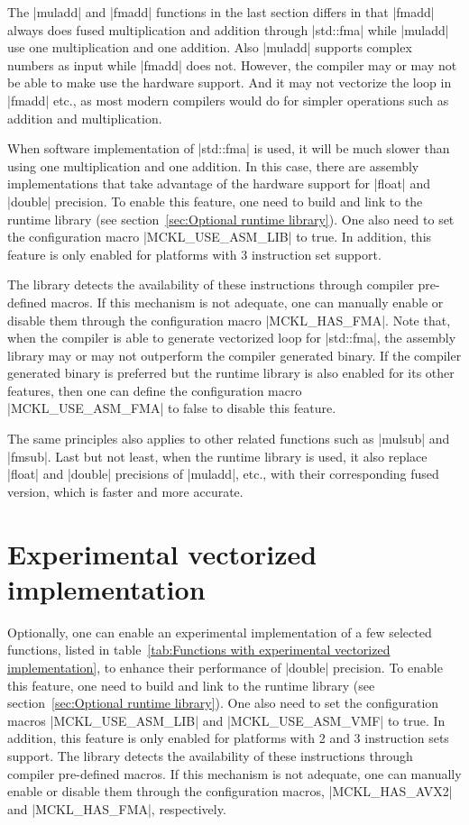 The |muladd| and |fmadd| functions in the last section differs in that |fmadd|
always does fused multiplication and addition through |std::fma| while |muladd|
use one multiplication and one addition. Also |muladd| supports complex numbers
as input while |fmadd| does not. However, the compiler may or may not be able
to make use the hardware \fma support. And it may not vectorize the loop in
|fmadd| etc., as most modern \cpp compilers would do for simpler operations
such as addition and multiplication.

When software implementation of |std::fma| is used, it will be much slower than
using one multiplication and one addition. In this case, there are assembly
implementations that take advantage of the hardware support for |float| and
|double| precision. To enable this feature, one need to build and link to the
runtime library (see section~\ref{sec:Optional runtime library}). One also need
to set the configuration macro |MCKL_USE_ASM_LIB| to true. In addition, this
feature is only enabled for platforms with \fma{}3 instruction set support.

The library detects the availability of these instructions through compiler
pre-defined macros. If this mechanism is not adequate, one can manually enable
or disable them through the configuration macro |MCKL_HAS_FMA|. Note that, when
the compiler is able to generate vectorized loop for |std::fma|, the assembly
library may or may not outperform the compiler generated binary. If the
compiler generated binary is preferred but the runtime library is also enabled
for its other features, then one can define the configuration macro
|MCKL_USE_ASM_FMA| to false to disable this feature.

The same principles also applies to other related functions such as |mulsub|
and |fmsub|. Last but not least, when the runtime library is used, it also
replace |float| and |double| precisions of |muladd|, etc., with their
corresponding fused version, which is faster and more accurate.

\section{Experimental vectorized implementation}
\label{sec:Experimental vectorized implementation}

Optionally, one can enable an experimental implementation of a few selected
functions, listed in table~\ref{tab:Functions with experimental vectorized
  implementation}, to enhance their performance of |double| precision. To
enable this feature, one need to build and link to the runtime library
(see section~\ref{sec:Optional runtime library}). One also need to set the
configuration macros |MCKL_USE_ASM_LIB| and |MCKL_USE_ASM_VMF| to true. In
addition, this feature is only enabled for platforms with \avx{}2 and \fma{}3
instruction sets support. The library detects the availability of these
instructions through compiler pre-defined macros. If this mechanism is not
adequate, one can manually enable or disable them through the configuration
macros, |MCKL_HAS_AVX2| and |MCKL_HAS_FMA|, respectively.

